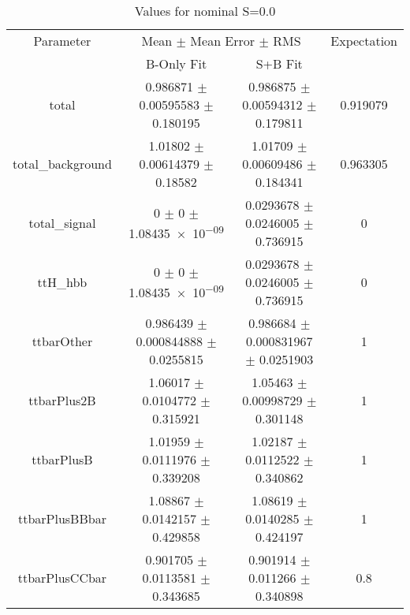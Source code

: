 \begin{table}
\centering
\caption{Values for nominal S=0.0}
\begin{tabular}{cccc}
\toprule
Parameter & \multicolumn{2}{c}{Mean $\pm$ Mean Error $\pm$ RMS} & Expectation\\
 & B-Only Fit & S+B Fit & \\
\midrule
total & \num{0.986871} $\pm$ \num{0.00595583} $\pm$ \num{0.180195} & \num{0.986875} $\pm$ \num{0.00594312} $\pm$ \num{0.179811} & \num{0.919079}\\
total\_background & \num{1.01802} $\pm$ \num{0.00614379} $\pm$ \num{0.18582} & \num{1.01709} $\pm$ \num{0.00609486} $\pm$ \num{0.184341} & \num{0.963305}\\
total\_signal & \num{0} $\pm$ \num{0} $\pm$ \num{1.08435e-09} & \num{0.0293678} $\pm$ \num{0.0246005} $\pm$ \num{0.736915} & \num{0}\\
ttH\_hbb & \num{0} $\pm$ \num{0} $\pm$ \num{1.08435e-09} & \num{0.0293678} $\pm$ \num{0.0246005} $\pm$ \num{0.736915} & \num{0}\\
ttbarOther & \num{0.986439} $\pm$ \num{0.000844888} $\pm$ \num{0.0255815} & \num{0.986684} $\pm$ \num{0.000831967} $\pm$ \num{0.0251903} & \num{1}\\
ttbarPlus2B & \num{1.06017} $\pm$ \num{0.0104772} $\pm$ \num{0.315921} & \num{1.05463} $\pm$ \num{0.00998729} $\pm$ \num{0.301148} & \num{1}\\
ttbarPlusB & \num{1.01959} $\pm$ \num{0.0111976} $\pm$ \num{0.339208} & \num{1.02187} $\pm$ \num{0.0112522} $\pm$ \num{0.340862} & \num{1}\\
ttbarPlusBBbar & \num{1.08867} $\pm$ \num{0.0142157} $\pm$ \num{0.429858} & \num{1.08619} $\pm$ \num{0.0140285} $\pm$ \num{0.424197} & \num{1}\\
ttbarPlusCCbar & \num{0.901705} $\pm$ \num{0.0113581} $\pm$ \num{0.343685} & \num{0.901914} $\pm$ \num{0.011266} $\pm$ \num{0.340898} & \num{0.8}\\
\bottomrule
\end{tabular}
\end{table}